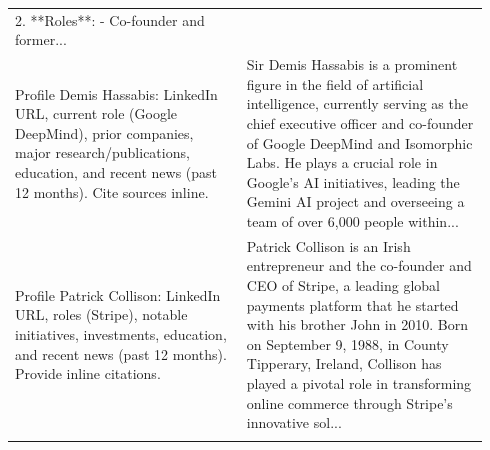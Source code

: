 \begin{longtable}{p{0.46\linewidth} p{0.48\linewidth}}
2. **Roles**:
   - Co-founder and former... \\
\addlinespace
Profile Demis Hassabis: LinkedIn URL, current role (Google DeepMind), prior companies, major research/publications, education, and recent news (past 12 months). Cite sources inline. & Sir Demis Hassabis is a prominent figure in the field of artificial intelligence, currently serving as the chief executive officer and co-founder of Google DeepMind and Isomorphic Labs. He plays a crucial role in Google's AI initiatives, leading the Gemini AI project and overseeing a team of over 6,000 people within... \\
\addlinespace
Profile Patrick Collison: LinkedIn URL, roles (Stripe), notable initiatives, investments, education, and recent news (past 12 months). Provide inline citations. & Patrick Collison is an Irish entrepreneur and the co-founder and CEO of Stripe, a leading global payments platform that he started with his brother John in 2010. Born on September 9, 1988, in County Tipperary, Ireland, Collison has played a pivotal role in transforming online commerce through Stripe's innovative sol... \\
\addlinespace
\bottomrule
\end{longtable}
